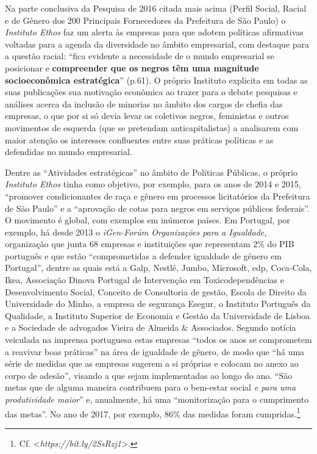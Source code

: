 Na parte conclusiva da Pesquisa de 2016 citada mais acima (Perfil
Social, Racial e de Gênero dos 200 Principais Fornecedores da Prefeitura
de São Paulo) o \emph{Instituto Ethos} faz um alerta às empresas para
que adotem políticas afirmativas voltadas para a agenda da diversidade
no âmbito empresarial, com destaque para a questão racial: ``fica
evidente a necessidade de o mundo empresarial se posicionar e
\textbf{compreender que os negros têm uma magnitude socioeconômica
estratégica}'' (p.61). O próprio Instituto explicita em todas as suas
publicações sua motivação econômica ao trazer para o debate pesquisas e
análises acerca da inclusão de minorias no âmbito dos cargos de chefia
das empresas, o que por si só devia levar os coletivos negros,
feministas e outros movimentos de esquerda (que se pretendam
anticapitalistas) a analisarem com maior atenção os interesses
confluentes entre suas práticas políticas e as defendidas no mundo
empresarial.

Dentre as ``Atividades estratégicas'' no âmbito de Políticas Públicas, o
próprio \emph{Instituto Ethos} tinha como objetivo, por exemplo, para os
anos de 2014 e 2015, ``promover condicionantes de raça e gênero em
processos licitatórios da Prefeitura de São Paulo'' e a ``aprovação de
cotas para negros em serviços públicos federais''. O movimento é global,
com exemplos em inúmeros países. Em Portugal, por exemplo, há desde 2013
o \emph{iGen-Forúm Organizações para a Igualdade,} organização que junta
68 empresas e instituições que representam 2\% do PIB português e que
estão ``comprometidas a defender igualdade de género em Portugal'',
dentre as quais está a Galp, Nestlé, Jumbo, Microsoft, edp, Coca-Cola,
Ikea, Associação Dinova Portugal de Intervenção em Toxicodependências e
Desenvolvimento Social, Conceito de Consultoria de gestão, Escola de
Direito da Universidade do Minho, a empresa de segurança Esegur, o
Instituto Português da Qualidade, a Instituto Superior de Economia e
Gestão da Universidade de Lisboa e a Sociedade de advogados Vieira de
Almeida \& Associados. Segundo notícia veiculada na imprensa portuguesa
estas empresas ``todos os anos se comprometem a reavivar boas práticas''
na área de igualdade de gênero, de modo que ``há uma série de medidas
que as empresas sugerem a si próprias e colocam no anexo ao corpo de
adesão'', visando a que sejam implementadas ao longo do ano. ``São metas
que de alguma maneira contribuem para o bem-estar social \emph{e para
uma produtividade maior}'' e, anualmente, há uma ``monitorização para o
cumprimento das metas''. No ano de 2017, por exemplo, 86\% das medidas
foram cumpridas.\footnote{Cf. \textless{}\emph{https://bit.ly/2SsRzj1}\textgreater{}.}

